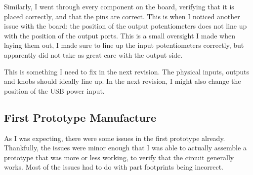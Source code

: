 \documentclass[a4paper]{article}
\begin{document}
Similarly, I went through every component on the board, verifying that it is placed correctly, and that the pins are correct. This is when I noticed another issue with the board: the position of the output potentiometers does not line up with the position of the output ports. This is a small oversight I made when laying them out, I made sure to line up the input potentiometers correctly, but apparently did not take as great care with the output side. 

\begin{center}
\small
{}
\end{center}

This is something I need to fix in the next revision. The physical inputs, outputs and knobs should ideally line up. In the next revision, I might also change the position of the USB power input.

\subsection{First Prototype Manufacture}

As I was expecting, there were some issues in the first prototype already. Thankfully, the issues were minor enough that I was able to actually assemble a prototype that was more or less working, to verify that the circuit generally works. Most of the issues had to do with part footprints being incorrect.

\end{document}
